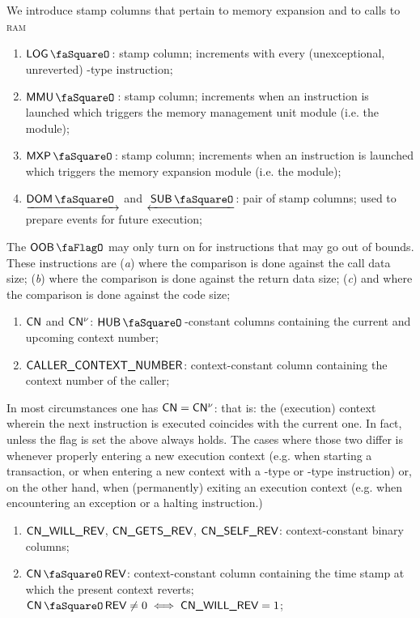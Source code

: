 We introduce stamp columns that pertain to memory expansion and to calls to \textsc{ram}
\begin{enumerate}[resume]
	\item $\logStamp$:
		stamp column; increments with every (unexceptional, unreverted) -type instruction; 
	\item $\mmuStamp$:
		stamp column; increments when an instruction is launched which triggers the memory management unit module (i.e. the \mmuMod{} module);
	\item $\mxpStamp$:
		stamp column; increments when an instruction is launched which triggers the memory expansion module (i.e. the \mxpMod{} module);
	\item $\domStamp$ and $\subStamp$:
		pair of stamp columns; used to prepare events for future execution; 
\end{enumerate}
The $\oobFlag$ may only turn on for instructions that may go out of bounds. These instructions are
(\emph{a})  where the comparison is done against the call data size;
(\emph{b})  where the comparison is done against the return data size;
(\emph{c})  and  where the comparison is done against the code size;
\begin{enumerate}[resume]
	\item $\textsf{CN}{}$ and $\textsf{CN}{}^{\nu}$:
		$\hubStamp{}$-constant columns containing the current and upcoming context number;
	\item $\textsf{CALLER\_CONTEXT\_NUMBER}{}$:
		context-constant column containing the context number of the caller;
\end{enumerate}
In most circumstances one has $\textsf{CN}{} = \textsf{CN}{}^{\nu}$: that is: the (execution) context wherein the next instruction is executed coincides with the current one. In fact, unless the \CONTEXTMAYCHANGE{} flag is set the above always holds. The cases where those two differ is whenever properly entering a new execution context (e.g. when starting a transaction, or when entering a new context with a -type or -type instruction) or, on the other hand, when (permanently) exiting an execution context (e.g. when encountering an exception or a halting instruction.) 
\begin{enumerate}[resume]
	\item $\textsf{CN}\textsf{\_WILL\_REV}$, $\textsf{CN}\textsf{\_GETS\_REV}$, $\textsf{CN}\textsf{\_SELF\_REV}$:
		context-constant binary columns;
	\item $\cnRevStamp$:
		context-constant column containing the time stamp at which the present context reverts; $\cnRevStamp \neq 0 \iff \cnWillRev = 1$;
\end{enumerate}
